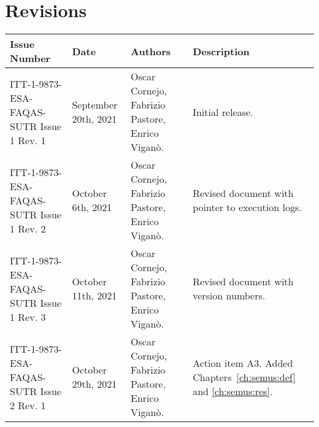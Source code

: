 
\section*{Revisions}
\label{sec:revisions}

\setlength\LTleft{0pt}
\setlength\LTright{0pt}
\scriptsize 
\begin{longtable}{|p{2cm}|p{2cm}|p{2cm}|p{7cm}|@{}}
\label{table:codeoperators} \\
\hline
\textbf{Issue Number}&\textbf{Date}&\textbf{Authors}&\textbf{Description}\\
\hline
ITT-1-9873-ESA-FAQAS-SUTR
Issue 1 Rev. 1&
September 20th, 2021&
Oscar Cornejo, Fabrizio Pastore, Enrico Viganò.&
\begin{minipage}{8cm}
Initial release.
\end{minipage}
\\
\hline
ITT-1-9873-ESA-FAQAS-SUTR
Issue 1 Rev. 2&
October 6th, 2021&
Oscar Cornejo, Fabrizio Pastore, Enrico Viganò.&
\begin{minipage}{8cm}
Revised document with pointer to execution logs.
\end{minipage}
\\
\hline
ITT-1-9873-ESA-FAQAS-SUTR
Issue 1 Rev. 3&
October 11th, 2021&
Oscar Cornejo, Fabrizio Pastore, Enrico Viganò.&
\begin{minipage}{8cm}
Revised document with version numbers.
\end{minipage}
\\
\hline
ITT-1-9873-ESA-FAQAS-SUTR
Issue 2 Rev. 1&
October 29th, 2021&
Oscar Cornejo, Fabrizio Pastore, Enrico Viganò.&
\begin{minipage}{8cm}
Action item A3. Added Chapters~\ref{ch:semus:def} and \ref{ch:semus:res}.
\end{minipage}
\\
\hline





                                                    
\end{longtable}
\normalsize

\clearpage